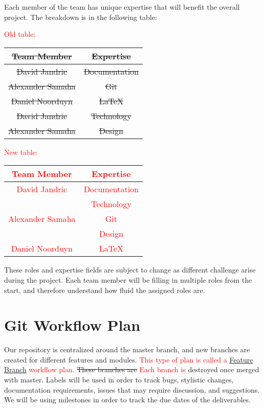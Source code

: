 \documentclass{article}
\begin{document}
Each member of the team has unique expertise that will benefit the overall
project. The breakdown is in the following table:

\textcolor{red}{Old table:}

\begin{center}
  \begin{tabular}{ |c|c| }
    \hline
    \sout{Team Member} & \sout{Expertise}\\
    \hline
     \sout{David Jandric} & \sout{Documentation}\\
     \sout{Alexander Samaha} & \sout{Git}\\
     \sout{Daniel Noorduyn} & \sout{LaTeX}\\
     \sout{David Jandric} & \sout{Technology}\\
     \sout{Alexander Samaha} & \sout{Design}\\
    \hline
  \end{tabular}
\end{center}

\textcolor{red}{New table:}

\begin{center}
  \begin{tabular}{ |c|c| }
    \hline
    \textcolor{red}{Team Member} & \textcolor{red}{Expertise}\\
    \hline
    \textcolor{red}{David Jandric} & \textcolor{red}{Documentation}\\
     & \textcolor{red}{Technology}\\
    \hline
    \textcolor{red}{Alexander Samaha} & \textcolor{red}{Git}\\
     & \textcolor{red}{Design}\\
    \hline
    \textcolor{red}{Daniel Noorduyn} & \textcolor{red}{LaTeX}\\
    \hline
  \end{tabular}
\end{center}

These roles and expertise fields are subject to change as different challenge
arise during the project. Each team member will be filling in multiple roles
from the start, and therefore understand how fluid the assigned roles are.

\section{Git Workflow Plan}

Our repository is centralized around the master branch, and new branches are
created for different features and modules. \textcolor{red}{This type of plan is
called a
\href{https://www.atlassian.com/git/tutorials/comparing-workflows/feature-branch-workflow}{Feature
Branch} workflow plan.} \sout{These branches are} \textcolor{red}{Each branch
is} destroyed once merged with master. Labels will be used in order to track
bugs, stylistic changes, documentation requirements, issues that may require
discussion, and suggestions. We will be using milestones in order to track the
due dates of the deliverables.
\end{document}
